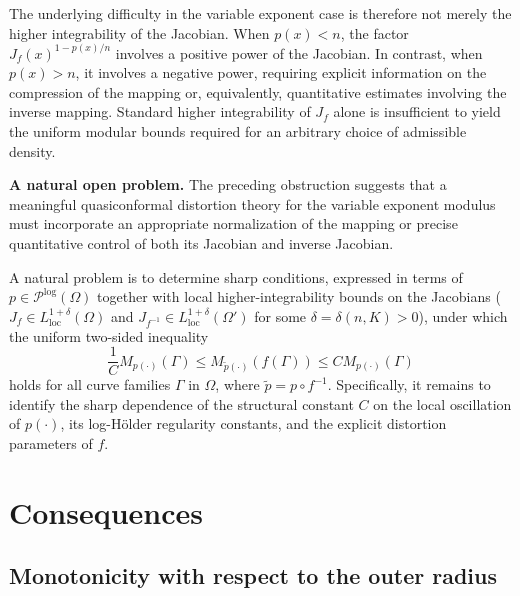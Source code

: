 \documentclass[12pt]{amsart}
\numberwithin{equation}{section}
\theoremstyle{plain}
\theoremstyle{definition}
\begin{document}
The underlying difficulty in the variable exponent case is therefore not merely the higher integrability of the Jacobian. When $p(x)<n$, the factor $J_f(x)^{1-p(x)/n}$ involves a positive power of the Jacobian. In contrast, when $p(x)>n$, it involves a negative power, requiring explicit information on the compression of the mapping or, equivalently, quantitative estimates involving the inverse mapping. Standard higher integrability of $J_f$ alone is insufficient to yield the uniform modular bounds required for an arbitrary choice of admissible density.

\medskip
\noindent
\textbf{A natural open problem.}
The preceding obstruction suggests that a meaningful quasiconformal distortion theory for the variable exponent modulus must incorporate an appropriate normalization of the mapping or precise quantitative control of both its Jacobian and inverse Jacobian.

A natural problem is to determine sharp conditions, expressed in terms of $p\in\mathcal P^{\log}(\Omega)$ together with local higher-integrability bounds on the Jacobians ($J_f\in L^{1+\delta}_{\mathrm{loc}}(\Omega)$ and $J_{f^{-1}}\in L^{1+\delta}_{\mathrm{loc}}(\Omega')$ for some $\delta=\delta(n,K)>0$), under which the uniform two-sided inequality
\begin{equation}
\label{eq:variable_qc_comparison}
\frac{1}{C} M_{p(\cdot)}(\Gamma) \le M_{\widetilde p(\cdot)}(f(\Gamma)) \le C M_{p(\cdot)}(\Gamma)
\end{equation}
holds for all curve families $\Gamma$ in $\Omega$, where $\widetilde p=p\circ f^{-1}$. Specifically, it remains to identify the sharp dependence of the structural constant $C$ on the local oscillation of $p(\cdot)$, its log-H\"older regularity constants, and the explicit distortion parameters of $f$.




\section{Consequences}
\label{sec:applications}

\subsection{Monotonicity with respect to the outer radius}
\end{document}
